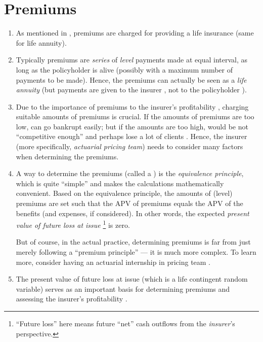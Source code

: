 \section{Premiums}
\label{sect:premiums}
\begin{enumerate}
\item As mentioned in , premiums
 are charged for providing a life insurance
 (same for life annuity).

\item Typically premiums  are \emph{series} of \emph{level}
payments made at equal interval, as long as the policyholder  is
alive (possibly with a maximum number of payments to be made).  Hence, the
premiums can actually be seen as a \emph{life annuity}
 (but payments are given to the insurer
, not to the policyholder ).

\item Due to the importance of premiums  to the insurer's
profitability , charging suitable amounts of premiums
 is crucial. If the amounts of premiums
 are too low,  can go bankrupt easily; but
if the amounts are too high,  would be not ``competitive
enough'' and perhaps lose a lot of clients . Hence, the insurer
 (more specifically, \emph{actuarial pricing team}) needs to
consider many factors when determining the premiums.

\item A way to determine the premiums (called a ) is
the \emph{equivalence principle}, which is quite ``simple'' and makes the
calculations mathematically convenient. Based on the equivalence principle, the
amounts of (level) premiums are set such that the APV of premiums equals the
APV of the benefits (and expenses, if considered). In other words, the expected
\emph{present value of future loss at issue} 
\footnote{``Future loss'' here means future ``net'' cash outflows from the
\emph{insurer}'s  perspective.} is zero.

\begin{note}
But of course, in the actual practice, determining premiums is far from just
merely following a ``premium principle'' --- it is much more complex. To learn
more, consider having an actuarial internship in pricing team
.
\end{note}


\item The present value of future loss at issue  (which is a life
contingent random variable) serves as an important basis for determining
premiums  and assessing the insurer's profitability
.
\end{enumerate}
